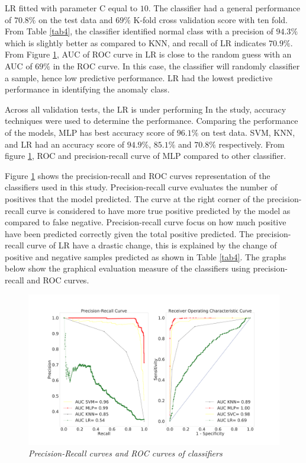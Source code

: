 \documentclass[a4paper,fleqn]{cas-dc}
\begin{document}
LR fitted with parameter  C equal to $10$. The classifier had a general performance of $70.8\%$ on the test data and $69\%$ K-fold cross validation score with ten fold. From Table \ref{tab4}, the classifier identified normal class with a precision of $94.3\%$ which is slightly better as compared to KNN, and recall of LR indicates  $70.9\% $. From Figure \ref{fig:rocall},  AUC of ROC curve in LR is close to the random guess with an AUC of $69\%$ in the ROC curve. In this case, the classifier will randomly classifier a sample, hence low predictive performance. LR had the lowest predictive performance in identifying the anomaly class.

Across all validation tests, the LR is under performing In the study, accuracy techniques were used to determine the performance. Comparing the performance of the models, MLP has best accuracy score of $96.1\%$ on test data. SVM, KNN, and LR had an accuracy score of $94.9\%$, $85.1\%$ and $70.8\%$ respectively. From figure \ref{fig:rocall}, ROC and precision-recall curve of MLP compared to other classifier. 

Figure \ref{fig:rocall} shows the precision-recall and ROC curves representation of the classifiers used in this study. Precision-recall curve evaluates the number of positives that the model predicted. The curve at the right corner of the precision-recall curve is considered to have more true positive predicted by the model as compared to false negative. Precision-recall curve focus on how much positive have been predicted correctly given the total positive predicted. The  precision-recall curve of LR have a drastic change, this is explained by the change of positive and negative samples predicted as shown in Table \ref{tab4}. The graphs below show the graphical evaluation measure of the classifiers using precision-recall and ROC curves.  
\begin{figure}
	\begin{minipage}[H]{\linewidth}
	\centering
	\includegraphics[width=1.1\linewidth]{Figures/ROC&PR.pdf}
\end{minipage}
	\caption{\textit{Precision-Recall curves and ROC curves of classifiers} }
	\label{fig:rocall}
\end{figure}
\end{document}
